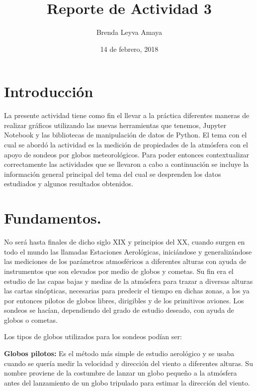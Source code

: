 \documentclass{article} %
\title{Reporte de Actividad 3}
\author{Brenda Leyva Amaya}
\date{14 de febrero, 2018}
\begin{document}
\maketitle %


\section{Introducción}

	La presente actividad tiene como fin el llevar a la práctica diferentes maneras de realizar gráficos utilizando las nuevas herramientas que tenemos, Jupyter Notebook y las bibliotecas de manipulación de datos de Python. El tema con el cual se abordó la actividad es la medición de propiedades de la atmósfera con el apoyo de sondeos por globos meteorológicos. Para poder entonces contextualizar correctamente las actividades que se llevaron a cabo a continuación se incluye la información general principal del tema del cual se desprenden los datos estudiados y algunos resultados obtenidos. 

\section{Fundamentos.}

No será hasta finales de dicho siglo XIX y principios del XX, cuando surgen en todo el mundo las llamadas Estaciones Aerológicas, iniciándose y generalizándose las mediciones de los parámetros atmosféricos a diferentes alturas con ayuda de instrumentos que son elevados por medio de globos y cometas. Su fin era el estudio de las capas bajas y medias de la atmósfera para trazar a diversas alturas las cartas sinópticas, necesarias para predecir el tiempo en dichas zonas, a los ya por entonces pilotos de globos libres, dirigibles y de los primitivos aviones. Los sondeos se hacían, dependiendo del grado de estudio deseado, con ayuda de globos o cometas.
\vspace{0.5 cm}

Los tipos de globos utilizados para los sondeos podían ser:
\vspace{0.5 cm}

\textbf{Globos pilotos:} Es el método más simple de estudio aerológico y se usaba cuando se quería medir la velocidad y dirección del viento a diferentes alturas. Su nombre proviene de la costumbre de lanzar un globo pequeño a la atmósfera antes del lanzamiento de un globo tripulado para estimar la dirección del viento.
\vspace{0.5 cm}
\end{document}
